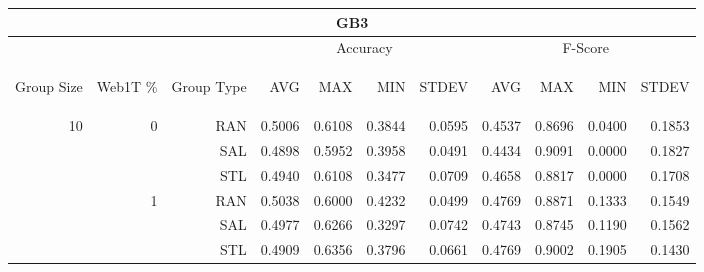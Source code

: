 \begin{center}
\begin{table}[htbp]
\begin{tabular}{ | r | r | r | r | r | r | r | r | r | r | r |}
\hline
\multicolumn{11}{|c|}{GB3}\\
\hline
 & & & \multicolumn{4}{|c|}{Accuracy} & \multicolumn{4}{|c|}{F-Score}\\ \cline{4-11}
\begin{sideways}Group Size\end{sideways} & \begin{sideways}Web1T \%\end{sideways} & \begin{sideways}Group Type\end{sideways} & \begin{sideways}AVG\end{sideways} & \begin{sideways}MAX\end{sideways} & \begin{sideways}MIN\end{sideways} & \begin{sideways}STDEV\end{sideways} & \begin{sideways}AVG\end{sideways} & \begin{sideways}MAX\end{sideways} & \begin{sideways}MIN\end{sideways} & \begin{sideways}STDEV\end{sideways}\\
\hline
\multirow{18}{*}{10}
 & \multirow{3}{*}{0} & RAN & 0.5006 & 0.6108 & 0.3844 & 0.0595 & 0.4537 & 0.8696 & 0.0400 & 0.1853\\ \cline{3-11}
 &   & SAL & 0.4898 & 0.5952 & 0.3958 & 0.0491 & 0.4434 & 0.9091 & 0.0000 & 0.1827\\ \cline{3-11}
 &   & STL & 0.4940 & 0.6108 & 0.3477 & 0.0709 & 0.4658 & 0.8817 & 0.0000 & 0.1708\\ \cline{2-11}
 & \multirow{3}{*}{1} & RAN & 0.5038 & 0.6000 & 0.4232 & 0.0499 & 0.4769 & 0.8871 & 0.1333 & 0.1549\\ \cline{3-11}
 &   & SAL & 0.4977 & 0.6266 & 0.3297 & 0.0742 & 0.4743 & 0.8745 & 0.1190 & 0.1562\\ \cline{3-11}
 &   & STL & 0.4909 & 0.6356 & 0.3796 & 0.0661 & 0.4769 & 0.9002 & 0.1905 & 0.1430\\ \cline{2-11}

\end{tabular}
\end{table}
\end{center}
